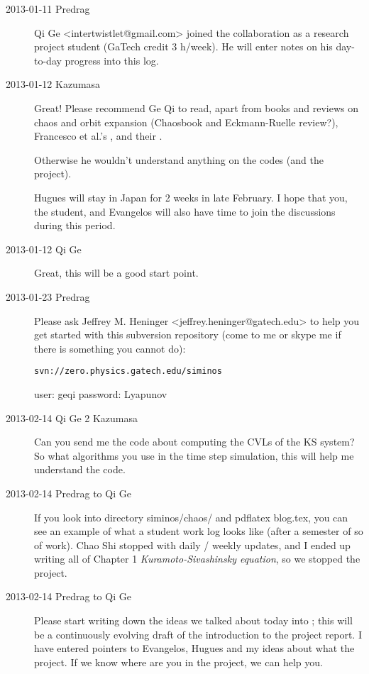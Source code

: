 \begin{description}

\item[2013-01-11 Predrag] Qi Ge  <intertwistlet@gmail.com> joined the
collaboration as a research project student (GaTech credit 3 h/week).
He will enter notes on his day-to-day progress into this log.

\item[2013-01-12 Kazumasa]
Great! Please recommend Ge Qi to read, apart from books and reviews on
chaos and orbit expansion (Chaosbook and Eckmann-Ruelle review?),
Francesco et al.'s
, and their
.

Otherwise he wouldn't understand anything on the codes (and the project).

Hugues will stay in Japan for 2 weeks in late February. I hope that you,
the student, and Evangelos will also have time to join the discussions
during this period.

\item[2013-01-12 Qi Ge]
Great, this will be a good start point.

\item[2013-01-23 Predrag] Please ask Jeffrey M. Heninger
<jeffrey.heninger@gatech.edu> to help you get started with this
subversion repository (come to me or skype me if there is something you
cannot do):

\texttt{svn://zero.physics.gatech.edu/siminos}

user: geqi  password: Lyapunov

\item[2013-02-14 Qi Ge 2 Kazumasa]
Can you send me the code about computing the CVLs of the KS system?
So what algorithms you use in the time step simulation, this will
help me understand the code.

\item[2013-02-14 Predrag to Qi Ge] If you look into directory
siminos/chaos/ and pdflatex blog.tex, you can see an example of what
a student work log looks like (after a semester of so of work). Chao
Shi stopped with daily / weekly updates, and I ended up writing all
of Chapter 1 {\em Kuramoto-Sivashinsky equation}, so we stopped the
project.

\item[2013-02-14 Predrag to Qi Ge] Please start writing down the
ideas we talked about today into ; this will
be a continuously evolving draft of the introduction to the project
report. I have entered pointers to Evangelos, Hugues and my ideas
about what the project. If we know where are you in the project, we can
help you.


\end{description}
